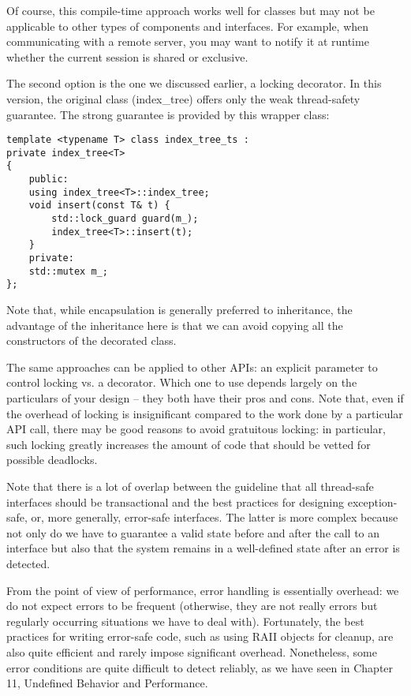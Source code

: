 Of course, this compile-time approach works well for classes but may not be applicable to other types of components and interfaces. For example, when communicating with a remote server, you may want to notify it at runtime whether the current session is shared or exclusive.

The second option is the one we discussed earlier, a locking decorator. In this version, the original class (index\_tree) offers only the weak thread-safety guarantee. The strong guarantee is provided by this wrapper class:

\begin{lstlisting}[style=styleCXX]
template <typename T> class index_tree_ts :
private index_tree<T> 
{
	public:
	using index_tree<T>::index_tree;
	void insert(const T& t) {
		std::lock_guard guard(m_);
		index_tree<T>::insert(t);
	}
	private:
	std::mutex m_;
};
\end{lstlisting}

Note that, while encapsulation is generally preferred to inheritance, the advantage of the inheritance here is that we can avoid copying all the constructors of the decorated class. 

The same approaches can be applied to other APIs: an explicit parameter to control locking vs. a decorator. Which one to use depends largely on the particulars of your design – they both have their pros and cons. Note that, even if the overhead of locking is insignificant compared to the work done by a particular API call, there may be good reasons to avoid gratuitous locking: in particular, such locking greatly increases the amount of code that should be vetted for possible deadlocks.

Note that there is a lot of overlap between the guideline that all thread-safe interfaces should be transactional and the best practices for designing exception-safe, or, more generally, error-safe interfaces. The latter is more complex because not only do we have to guarantee a valid state before and after the call to an interface but also that the system remains in a well-defined state after an error is detected. 

From the point of view of performance, error handling is essentially overhead: we do not expect errors to be frequent (otherwise, they are not really errors but regularly occurring situations we have to deal with). Fortunately, the best practices for writing error-safe code, such as using RAII objects for cleanup, are also quite efficient and rarely impose significant overhead. Nonetheless, some error conditions are quite difficult to detect reliably, as we have seen in Chapter 11, Undefined Behavior and Performance.

